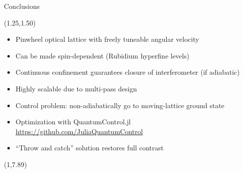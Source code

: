 \documentclass[compress, aspectratio=169]{beamer}
\begin{document}
\begin{frame}{Conclusions}
  \begin{textblock}{14.5}(1.25,1.50)
    \begin{itemize}
      \item Pinwheel optical lattice with freely tuneable angular velocity
      \item Can be made spin-dependent (Rubidium hyperfine levels)
      \item Continuous confinement guarantees closure of interferometer (if adiabatic)
      \item Highly scalable due to multi-pass design
    \end{itemize}
    \par
    \vspace{14pt}
    \begin{itemize}
      \item Control problem: non-adiabatically go to moving-lattice ground state
      \item Optimization with QuantumControl.jl\\
            \url{https://github.com/JuliaQuantumControl}
      \item ``Throw and catch'' solution restores full contrast
    \end{itemize}
  \end{textblock}
  \begin{textblock}{14}(1,7.89)
  \end{textblock}
\end{frame}
\end{document}
